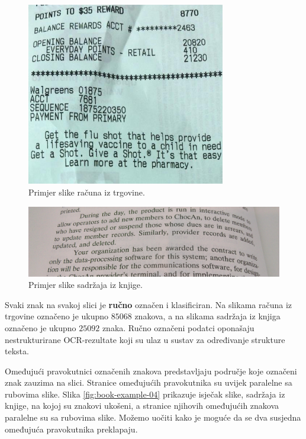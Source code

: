 \documentclass[times, utf8, zavrsni]{fer}
\begin{document}
\begin{figure}[htb]
    \centering
    \captionsetup{justification=centering,margin=2cm}
    \includegraphics[height=8cm]{images/receipt-example-04.jpg}
    \caption{Primjer slike računa iz trgovine.}
    \label{fig:receipt-example-04}
\end{figure}

\begin{figure}[htb]
    \centering
    \captionsetup{justification=centering,margin=2cm}
    \includegraphics[width=\textwidth]{images/book-example-03.jpg}
    \caption{Primjer slike sadržaja iz knjige.}
    \label{fig:book-example-03}
\end{figure}

Svaki znak na svakoj slici je \textbf{ručno} označen i klasificiran. Na slikama
računa iz trgovine označeno je ukupno $85068$ znakova, a na slikama sadržaja iz
knjiga označeno je ukupno $25092$ znaka. Ručno označeni podatci oponašaju
nestrukturirane OCR-rezultate koji su ulaz u sustav za određivanje strukture
teksta.

Omeđujući pravokutnici označenih znakova predstavljaju područje koje označeni
znak zauzima na slici. Stranice omeđujućih pravokutnika su uvijek paralelne sa
rubovima slike. Slika \ref{fig:book-example-04} prikazuje isječak slike,
sadržaja iz knjige, na kojoj su znakovi ukošeni, a stranice njihovih omeđujućih
znakova paralelne su sa rubovima slike. Možemo uočiti kako je moguće da se dva
susjedna omeđujuća pravokutnika preklapaju.
\end{document}
